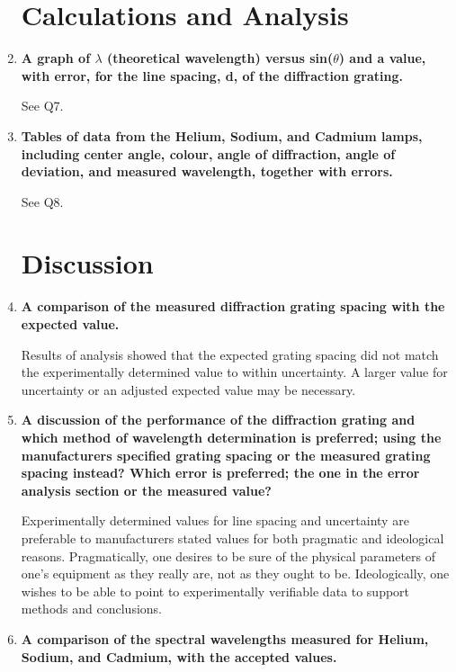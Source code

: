 \begin{enumerate}
\section{Calculations and Analysis}

\item {\bf A graph of $\lambda$ (theoretical wavelength) versus sin($\theta$) and a value, with error, for the line spacing, d, of the diffraction grating.}\newline

See Q7.

\item {\bf Tables of data from the Helium, Sodium, and Cadmium lamps, including center angle, colour, angle of diffraction, angle of deviation, and measured wavelength, together with errors.}\newline

See Q8.

\section{Discussion}

\item {\bf A comparison of the measured diffraction grating spacing with the expected value.}\newline

Results of analysis showed that the expected grating spacing did not match the experimentally determined value to within uncertainty. A larger value for uncertainty or an adjusted expected value may be necessary.

\item {\bf A discussion of the performance of the diffraction grating and which method of wavelength determination is preferred; using the manufacturers specified grating spacing or the measured grating spacing instead? Which error is preferred; the one in the error analysis section or the measured value?}\newline

Experimentally determined values for line spacing and uncertainty are preferable to manufacturers stated values for both pragmatic and ideological reasons. Pragmatically, one desires to be sure of the physical parameters of one's equipment as they really are, not as they ought to be. Ideologically, one wishes to be able to point to experimentally verifiable data to support methods and conclusions.

\item {\bf A comparison of the spectral wavelengths measured for Helium, Sodium, and Cadmium, with the accepted values.}\newline


\end{enumerate}
